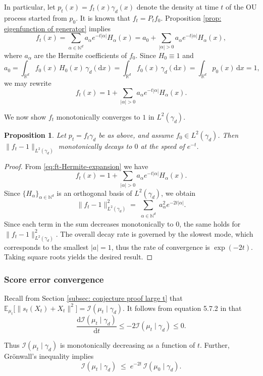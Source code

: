 \documentclass[12pt]{article}
\newcommand{\0}{\mathbf{0}}
\newcommand{\diff}{\mathrm{d}}
\newcommand{\R}{\mathbb{R}}
\newcommand{\E}{\mathbb{E}}
\newcommand{\FI}{\mathcal{I}}  %
\newtheorem{prop}{Proposition}
\begin{document}
In particular, let $p_t(x) = f_t(x)\gamma_d(x)$ denote the density at time $t$ of the OU process started from $p_0$. It is known that $f_t = P_t f_0$. Proposition \ref{prop: eigenfunction of generator} implies
\[
f_t(x) = \sum_{\alpha\in\mathbb N^d} a_\alpha e^{-t|\alpha|} H_\alpha(x)
	= a_0 + \sum_{|\alpha|>0} a_\alpha e^{-t|\alpha|} H_\alpha(x),
\]
where $a_\alpha$ are the Hermite coefficients of $f_0$. Since $H_0\equiv 1$ and
\[
a_0 = \int_{\R^d} f_0(x)\,H_0(x)\,\gamma_d(\diff x)
	= \int_{\R^d} f_0(x)\,\gamma_d(\diff x)
	= \int_{\R^d} p_0(x)\,\diff x = 1,
\]
we may rewrite
\begin{equation}\label{eq:ft-Hermite-expansion}
f_t(x) = 1 + \sum_{|\alpha|>0} a_\alpha e^{-t|\alpha|} H_\alpha(x).
\end{equation}

We now show $f_t$ monotonically converges to $1$ in $L^2(\gamma_d)$.

\begin{prop}\label{prop:odd-even-ft}
Let $p_t=f_t\gamma_d$ be as above, and assume $f_0\in L^2(\gamma_d)$. Then $\|f_t - 1\|_{L^2(\gamma_d)}$ monotonically decays to $0$ at the speed of $e^{-t}$.
\end{prop}

\begin{proof}
From \eqref{eq:ft-Hermite-expansion} we have
\[
f_t(x)
= 1 + \sum_{|\alpha|>0} a_\alpha e^{-t|\alpha|} H_\alpha(x).
\]
Since $\{H_\alpha\}_{\alpha\in\mathbb N^d}$ is an orthogonal basis of $L^2(\gamma_d)$, we obtain
\[
\|f_t - 1\|_{L^2(\gamma_d)}^2
= \sum_{\substack{\alpha\in\mathbb N^d}}
	a_\alpha^2 e^{-2t|\alpha|}.
\]
Since each term in the sum decreases monotonically to $0$, the same holds for $\|f_t - 1\|_{L^2(\gamma_d)}^2$. The overall decay rate is governed by the slowest mode, which corresponds to the smallest $\lvert a \rvert = 1$, thus the rate of convergence is $\exp(-2t)$.
Taking square roots yields the desired result.
\end{proof}

\subsubsection{Score error convergence}
Recall from Section \ref{subsec: conjecture proof large t} that
$\E_{\mu_t}\!\bigl[\|s_t(X_t) + X_t\|^2\bigr] = \FI(\mu_t\mid\gamma_d)$. It follows from equation 5.7.2 in \cite{bakry2013analysis} that
\[
\frac{\diff \FI(\mu_t\mid\gamma_d) }{\diff t} \leq -2 \FI(\mu_t\mid\gamma_d)\leq 0.
\]

Thus $\FI(\mu_t\mid\gamma_d)$ is monotonically decreasing as a function of $t$. Further, Grönwall's inequality implies 
\[\FI(\mu_t\mid\gamma_d)\;\le\;e^{-2t}\,\FI(\mu_0\mid\gamma_d).\]
\end{document}
